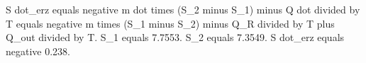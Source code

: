 S dot_erz equals negative m dot times (S_2 minus S_1) minus Q dot divided by T equals negative m times (S_1 minus S_2) minus Q_R divided by T plus Q_out divided by T.  
S_1 equals 7.7553.  
S_2 equals 7.3549.  
S dot_erz equals negative 0.238.
